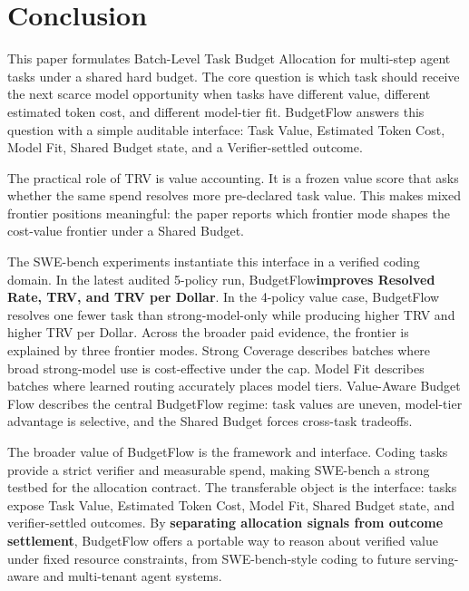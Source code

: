 \documentclass{article}
\newcommand{\method}{BudgetFlow\xspace}
\newcommand{\trv}{TRV\xspace}
\newcommand{\taskvalue}{Task Value\xspace}
\newcommand{\tokencost}{Estimated Token Cost\xspace}
\newcommand{\modelfit}{Model Fit\xspace}
\newcommand{\sharedbudget}{Shared Budget\xspace}
\newcommand{\verifier}{Verifier\xspace}
\begin{document}
\section{Conclusion}
This paper formulates Batch-Level Task Budget Allocation for multi-step agent tasks under a shared hard budget. The core question is which task should receive the next scarce model opportunity when tasks have different value, different estimated token cost, and different model-tier fit. \method answers this question with a simple auditable interface: \taskvalue, \tokencost, \modelfit, \sharedbudget state, and a \verifier-settled outcome.

The practical role of \trv is value accounting. It is a frozen value score that asks whether the same spend resolves more pre-declared task value. This makes mixed frontier positions meaningful: the paper reports which frontier mode shapes the cost-value frontier under a \sharedbudget.

The SWE-bench experiments instantiate this interface in a verified coding domain. In the latest audited 5-policy run, \method \textbf{improves Resolved Rate, \trv, and \trv per Dollar}. In the 4-policy value case, \method resolves one fewer task than strong-model-only while producing higher \trv and higher \trv per Dollar. Across the broader paid evidence, the frontier is explained by three frontier modes. Strong Coverage describes batches where broad strong-model use is cost-effective under the cap. Model Fit describes batches where learned routing accurately places model tiers. Value-Aware Budget Flow describes the central \method regime: task values are uneven, model-tier advantage is selective, and the \sharedbudget forces cross-task tradeoffs.

The broader value of \method is the framework and interface. Coding tasks provide a strict verifier and measurable spend, making SWE-bench a strong testbed for the allocation contract. The transferable object is the interface: tasks expose \taskvalue, \tokencost, \modelfit, \sharedbudget state, and verifier-settled outcomes. By \textbf{separating allocation signals from outcome settlement}, BudgetFlow offers a portable way to reason about verified value under fixed resource constraints, from SWE-bench-style coding to future serving-aware and multi-tenant agent systems.



\end{document}
